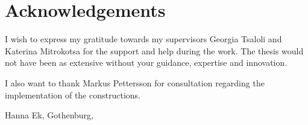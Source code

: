 \thispagestyle{plain}			%
\section*{Acknowledgements}
I wish to express my gratitude towards my supervisors Georgia Tsaloli and  Katerina Mitrokotsa for the support and help during the work. The thesis would not have been as extensive without your guidance, expertise and innovation.

I also want to thank Markus Pettersson for consultation regarding the implementation of the constructions. 

\vspace{1.5cm}
\hfill
Hanna Ek, Gothenburg, \monthname \space \the\year

\newpage				%
\thispagestyle{empty}
\mbox{}
